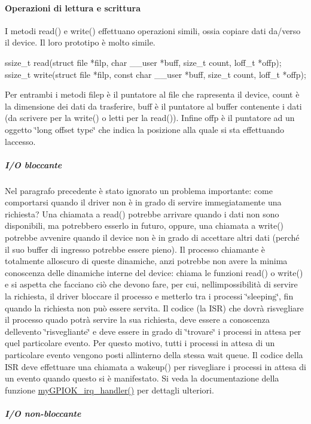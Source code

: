 \paragraph*{Operazioni di lettura e scrittura}

I metodi read() e write() effettuano operazioni simili, ossia copiare dati da/verso il device. Il loro prototipo è molto simile. 
\begin{DoxyCode}
ssize\_t read(\textcolor{keyword}{struct} file *filp, \textcolor{keywordtype}{char} \_\_user *buff, \textcolor{keywordtype}{size\_t} count, loff\_t *offp);
ssize\_t write(\textcolor{keyword}{struct} file *filp, \textcolor{keyword}{const} \textcolor{keywordtype}{char} \_\_user *buff, \textcolor{keywordtype}{size\_t} count, loff\_t *offp);
\end{DoxyCode}
 Per entrambi i metodi filep è il puntatore al file che rapresenta il device, count è la dimensione dei dati da trasferire, buff è il puntatore al buffer contenente i dati (da scrivere per la write() o letti per la read()). Infine offp è il puntatore ad un oggetto \char`\"{}long offset type\char`\"{} che indica la posizione alla quale si sta effettuando l\textquotesingle{}accesso.

\subparagraph*{I/O bloccante}

Nel paragrafo precedente è stato ignorato un problema importante\+: come comportarsi quando il driver non è in grado di servire immegiatamente una richiesta? Una chiamata a read() potrebbe arrivare quando i dati non sono disponibili, ma potrebbero esserlo in futuro, oppure, una chiamata a write() potrebbe avvenire quando il device non è in grado di accettare altri dati (perché il suo buffer di ingresso potrebbe essere pieno). Il processo chiamante è totalmente all\textquotesingle{}oscuro di queste dinamiche, anzi potrebbe non avere la minima conoscenza delle dinamiche interne del device\+: chiama le funzioni read() o write() e si aspetta che facciano ciò che devono fare, per cui, nell\textquotesingle{}impossibilità di servire la richiesta, il driver bloccare il processo e metterlo tra i processi \char`\"{}sleeping\char`\"{}, fin quando la richiesta non può essere servita. Il codice (la I\+SR) che dovrà risvegliare il processo quado potrà servire la sua richiesta, deve essere a conoscenza dell\textquotesingle{}evento \char`\"{}risvegliante\char`\"{} e deve essere in grado di \char`\"{}trovare\char`\"{} i processi in attesa per quel particolare evento. Per questo motivo, tutti i processi in attesa di un particolare evento vengono posti all\textquotesingle{}interno della stessa wait queue. Il codice della I\+SR deve effettuare una chiamata a wakeup() per risvegliare i processi in attesa di un evento quando questo si è manifestato. Si veda la documentazione della funzione \hyperlink{group___linux-_driver_ga2fc230a12a97aa63e43b2dc4aec73511}{my\+G\+P\+I\+O\+K\+\_\+irq\+\_\+handler()} per dettagli ulteriori. \subparagraph*{I/O non-\/bloccante}

